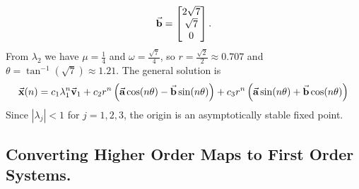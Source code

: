 \begin{xexample}
\begin{equation}
    \vec{\textbf{b}} = \begin{bmatrix} 2\sqrt{7} \\ \sqrt{7} \\ 0\end{bmatrix}.
\end{equation}
From $\lambda_2$ we have $\mu = \frac{1}{4}$ and
$\omega = \frac{\sqrt{7}}{4}$, so
$r = \frac{\sqrt{2}}{2} \approx 0.707$ and $\theta = \tan^{-1}(\sqrt{7}) \approx 1.21$.
The general solution is
\begin{equation}
  \vec{\textbf{x}}(n) = c_1 \lambda_1^n \vec{\textbf{v}}_1 +
          c_2 r^n\left(\vec{\textbf{a}}\cos(n\theta) - \vec{\textbf{b}}\sin(n\theta)\right) +
          c_3 r^n\left(\vec{\textbf{a}}\sin(n\theta) + \vec{\textbf{b}}\cos(n\theta)\right) 
\end{equation}
Since
$|\lambda_j| < 1$ for $j=1,2,3$,
the origin is an
asymptotically stable fixed point.
\end{xexample}

\subsection*{Converting Higher Order Maps to First Order Systems.}


